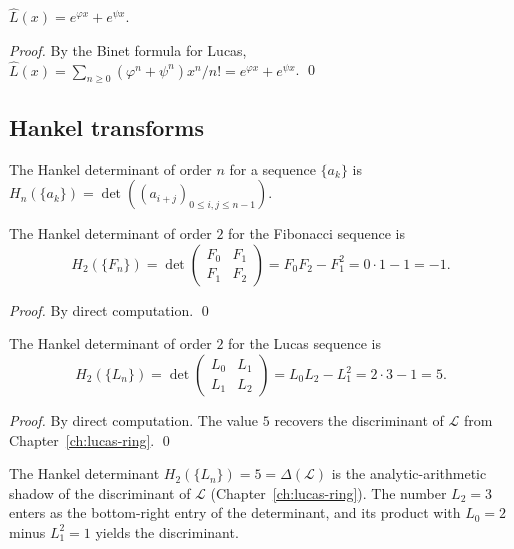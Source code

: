 \begin{lemma}
\label{lem:05-luc-egf}
$\hat{L}(x) = e^{\varphi x} + e^{\psi x}$.
\end{lemma}

\begin{proof}
By the Binet formula for Lucas, $\hat{L}(x) = \sum_{n \ge 0} (\varphi^n + \psi^n) x^n/n!
= e^{\varphi x} + e^{\psi x}$. \qed
\end{proof}

\subsection{Hankel transforms}

\begin{definition}
\label{def:05-hankel}
The Hankel determinant of order $n$ for a sequence $\{a_k\}$ is
$H_n(\{a_k\}) = \det((a_{i+j})_{0 \le i, j \le n-1})$.
\end{definition}

\begin{lemma}
\label{lem:05-fib-hankel}
The Hankel determinant of order $2$ for the Fibonacci sequence is
\[
  H_2(\{F_n\}) = \det \begin{pmatrix} F_0 & F_1 \\ F_1 & F_2 \end{pmatrix} = F_0 F_2 - F_1^2 = 0 \cdot 1 - 1 = -1.
\]
\end{lemma}

\begin{proof}
By direct computation. \qed
\end{proof}

\begin{lemma}
\label{lem:05-luc-hankel}
The Hankel determinant of order $2$ for the Lucas sequence is
\[
  H_2(\{L_n\}) = \det \begin{pmatrix} L_0 & L_1 \\ L_1 & L_2 \end{pmatrix} = L_0 L_2 - L_1^2 = 2 \cdot 3 - 1 = 5.
\]
\end{lemma}

\begin{proof}
By direct computation. The value $5$ recovers the discriminant of
$\mathcal{L}$ from Chapter~\ref{ch:lucas-ring}. \qed
\end{proof}

\begin{remark}
The Hankel determinant $H_2(\{L_n\}) = 5 = \Delta(\mathcal{L})$ is the
analytic-arithmetic shadow of the discriminant of $\mathcal{L}$
(Chapter~\ref{ch:lucas-ring}). The number $L_2 = 3$ enters as
the bottom-right entry of the determinant, and its product with $L_0 = 2$
minus $L_1^2 = 1$ yields the discriminant.
\end{remark}

